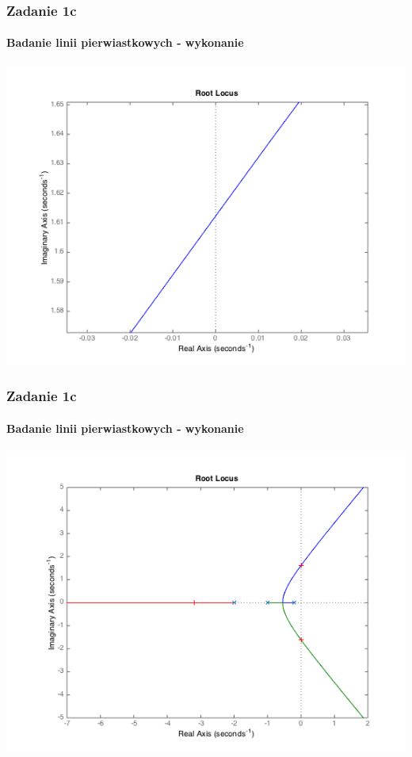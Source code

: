 \documentclass{beamer}
\begin{document}
\begin{frame}\frametitle{Zadanie 1c}\framesubtitle{Badanie linii pierwiastkowych - wykonanie}
	
	\centering	\includegraphics[scale=0.45]{zadanie1_c2.png}
	
\end{frame}

\begin{frame}\frametitle{Zadanie 1c}\framesubtitle{Badanie linii pierwiastkowych - wykonanie}
	
	\centering	\includegraphics[scale=0.45]{zadanie1_c.png}
	
\end{frame}
\end{document}
